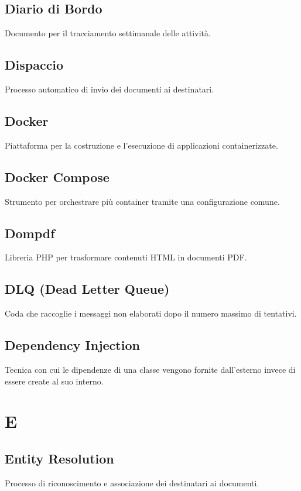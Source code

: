 \documentclass[a4paper,12pt]{article}
\begin{document}
\subsection{Diario di Bordo}
Documento per il tracciamento settimanale delle attività.

\subsection{Dispaccio}
Processo automatico di invio dei documenti ai destinatari.

\subsection{Docker}
Piattaforma per la costruzione e l'esecuzione di applicazioni containerizzate.

\subsection{Docker Compose}
Strumento per orchestrare più container tramite una configurazione comune.

\subsection{Dompdf}
Libreria PHP per trasformare contenuti HTML in documenti PDF.

\subsection{DLQ (Dead Letter Queue)}
Coda che raccoglie i messaggi non elaborati dopo il numero massimo di tentativi.

\subsection{Dependency Injection}
Tecnica con cui le dipendenze di una classe vengono fornite dall'esterno invece di essere create al suo interno.

\section{E}

\subsection{Entity Resolution}
Processo di riconoscimento e associazione dei destinatari ai documenti.
\end{document}
